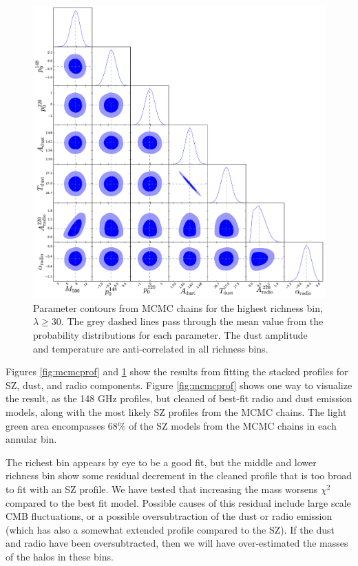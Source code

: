 \documentclass[a4paper,fleqn,usenatbib]{mnras}
\begin{document}
\begin{figure}
  \centering
  \includegraphics[width= \columnwidth] {corner_0190123_nw_18_ns_10000_mbatalpha_tophat_11_arcmin_zbin01_rbin2_v4_sigalpha02_numpy_cut_1000.pdf}
  \caption{Parameter contours from MCMC chains for the highest richness bin, $\lambda \geq 30$. The grey dashed lines pass through the mean value from the probability distributions for each parameter. The dust amplitude and temperature are anti-correlated in all richness bins.}  \label{fig:mcmccontours}
\end{figure}



Figures \ref{fig:mcmcprof} and \ref{fig:mcmccontours} show the results from fitting the stacked profiles for SZ, dust, and radio components. 
Figure \ref{fig:mcmcprof} shows one way to visualize the result, as the 148 GHz profiles, but cleaned of best-fit radio and dust emission models, along with the most likely SZ profiles from the MCMC chains. 
The light green area encompasses 68\% of the SZ models from the MCMC chains in each annular bin.  

The richest bin appears by eye to be a good fit, but the middle and lower richness bin show some residual decrement in the cleaned profile that is too broad to fit with an SZ profile.  
We have tested that increasing the mass worsens $\chi^2$ compared to the best fit model.  
Possible causes of this residual include large scale CMB fluctuations, or a possible oversubtraction of the dust or radio emission (which has also a somewhat extended profile compared to the SZ).  
If the dust and radio have been oversubtracted, then we will have over-estimated the masses of the halos in these bins.
\end{document}
